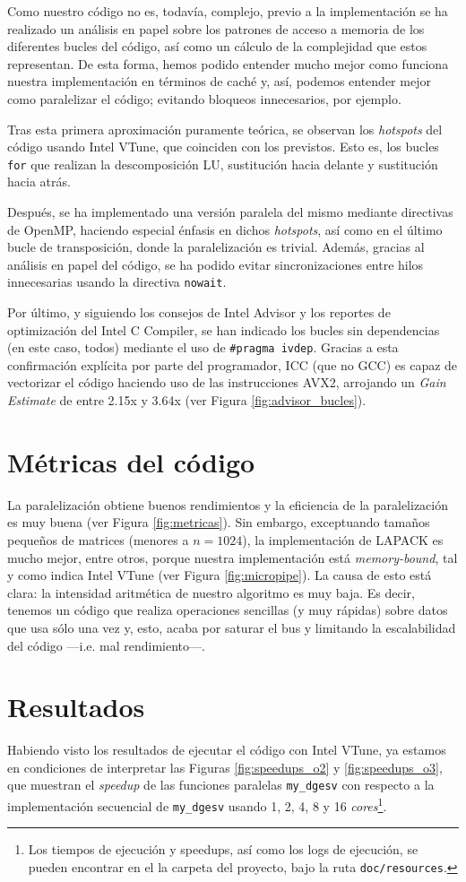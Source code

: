 \documentclass[12pt]{article}
\begin{document}
Como nuestro código no es, todavía, complejo, previo a la implementación se ha realizado un análisis en papel sobre los patrones de acceso a memoria de los diferentes bucles del código, así como un cálculo de la complejidad que estos representan. De esta forma, hemos podido entender mucho mejor como funciona nuestra implementación en términos de caché y, así, podemos entender mejor como paralelizar el código; evitando bloqueos innecesarios, por ejemplo.

Tras esta primera aproximación puramente teórica, se observan los \textit{hotspots} del código usando Intel VTune, que coinciden con los previstos. Esto es, los bucles \texttt{for} que realizan la descomposición LU, sustitución hacia delante y sustitución hacia atrás.

Después, se ha implementado una versión paralela del mismo mediante directivas de OpenMP, haciendo especial énfasis en dichos \textit{hotspots}, así como en el último bucle de transposición, donde la paralelización es trivial. Además, gracias al análisis en papel del código, se ha podido evitar sincronizaciones entre hilos innecesarias usando la directiva \texttt{nowait}.

Por último, y siguiendo los consejos de Intel Advisor y los reportes de optimización del Intel C Compiler, se han indicado los bucles sin dependencias (en este caso, todos) mediante el uso de \texttt{\#pragma ivdep}. Gracias a esta confirmación explícita por parte del programador, ICC (que no GCC) es capaz de vectorizar el código haciendo uso de las instrucciones AVX2, arrojando un \textit{Gain Estimate} de entre 2.15x y 3.64x (ver Figura \ref{fig:advisor_bucles}).
\section{Métricas del código}
La paralelización obtiene buenos rendimientos y la eficiencia de la paralelización es muy buena (ver Figura \ref{fig:metricas}). Sin embargo, exceptuando tamaños pequeños de matrices (menores a $n = 1024$), la implementación de LAPACK es mucho mejor, entre otros, porque nuestra implementación está \textit{memory-bound}, tal y como indica Intel VTune (ver Figura \ref{fig:micropipe}). La causa de esto está clara: la intensidad aritmética de nuestro algoritmo es muy baja. Es decir, tenemos un código que realiza operaciones sencillas (y muy rápidas) sobre datos que usa sólo una vez y, esto, acaba por saturar el bus y limitando la escalabilidad del código ---i.e. mal rendimiento---.
\section{Resultados}
Habiendo visto los resultados de ejecutar el código con Intel VTune, ya estamos en condiciones de interpretar las Figuras \ref{fig:speedups_o2} y \ref{fig:speedups_o3}, que muestran el \textit{speedup} de las funciones paralelas \texttt{my\_dgesv} con respecto a la implementación secuencial de \texttt{my\_dgesv} usando 1, 2, 4, 8 y 16 \textit{cores}\footnote{Los tiempos de ejecución y speedups, así como los logs de ejecución, se pueden encontrar en el la carpeta del proyecto, bajo la ruta \texttt{doc/resources}.}.
\end{document}
